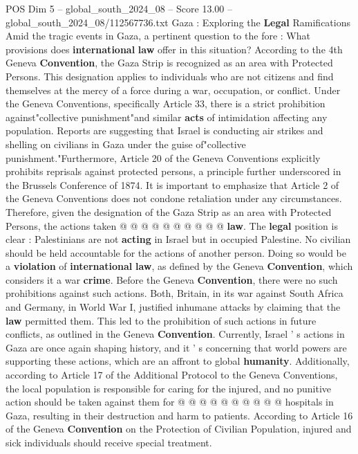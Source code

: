 \begin{textsample}{POS Dim 5 – global\_south\_2024\_08 – Score 13.00 – global\_south\_2024\_08/112567736.txt}  \label{ex:f5_pos_284}
Gaza : Exploring the \textbf{Legal} Ramifications Amid the tragic events in Gaza, a pertinent question to the fore : What provisions does \textbf{international} \textbf{law} offer in this situation?
According to the 4th Geneva \textbf{Convention}, the Gaza Strip is recognized as an area with Protected Persons.
This designation applies to individuals who are not citizens and find themselves at the mercy of a force during a war, occupation, or conflict.
Under the Geneva Conventions, specifically Article 33, there is a strict prohibition against"collective punishment"and similar \textbf{acts} of intimidation affecting any population.
Reports are suggesting that Israel is conducting air strikes and shelling on civilians in Gaza under the guise of"collective punishment."Furthermore, Article 20 of the Geneva Conventions explicitly prohibits reprisals against protected persons, a principle further underscored in the Brussels Conference of 1874.
It is important to emphasize that Article 2 of the Geneva Conventions does not condone retaliation under any circumstances.
Therefore, given the designation of the Gaza Strip as an area with Protected Persons, the actions taken @ @ @ @ @ @ @ @ @ @ \textbf{law}.
The \textbf{legal} position is clear : Palestinians are not \textbf{acting} in Israel but in occupied Palestine.
No civilian should be held accountable for the actions of another person.
Doing so would be a \textbf{violation} of \textbf{international} \textbf{law}, as defined by the Geneva \textbf{Convention}, which considers it a war \textbf{crime}.
Before the Geneva \textbf{Convention}, there were no such prohibitions against such actions.
Both, Britain, in its war against South Africa and Germany, in World War I, justified inhumane attacks by claiming that the \textbf{law} permitted them.
This led to the prohibition of such actions in future conflicts, as outlined in the Geneva \textbf{Convention}.
Currently, Israel ' s actions in Gaza are once again shaping history, and it ' s concerning that world powers are supporting these actions, which are an affront to global \textbf{humanity}.
Additionally, according to Article 17 of the Additional Protocol to the Geneva Conventions, the local population is responsible for caring for the injured, and no punitive action should be taken against them for @ @ @ @ @ @ @ @ @ @ hospitals in Gaza, resulting in their destruction and harm to patients.
According to Article 16 of the Geneva \textbf{Convention} on the Protection of Civilian Population, injured and sick individuals should receive special treatment.

\end{textsample}
